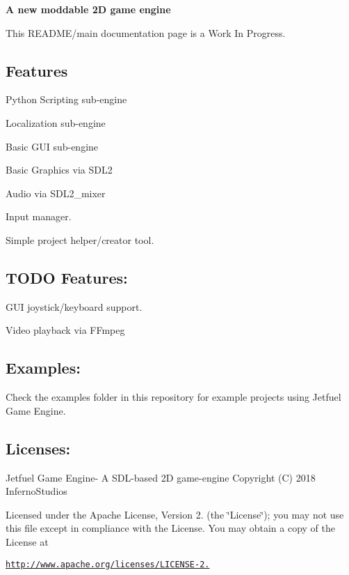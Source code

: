 {\bfseries A new moddable 2D game engine}

This R\+E\+A\+D\+M\+E/main documentation page is a Work In Progress.

\subsection*{Features}


\begin{DoxyItemize}
\item Python Scripting sub-\/engine
\item Localization sub-\/engine
\item Basic G\+UI sub-\/engine
\item Basic Graphics via S\+D\+L2
\item Audio via S\+D\+L2\+\_\+mixer
\item Input manager.
\item Simple project helper/creator tool.
\end{DoxyItemize}

\subsection*{T\+O\+DO Features\+:}


\begin{DoxyItemize}
\item G\+UI joystick/keyboard support.
\item Video playback via F\+Fmpeg
\end{DoxyItemize}

\subsection*{Examples\+:}

Check the examples folder in this repository for example projects using Jetfuel Game Engine.

\subsection*{Licenses\+:}

Jetfuel Game Engine-\/ A S\+D\+L-\/based 2D game-\/engine Copyright (C) 2018 Inferno\+Studios

Licensed under the Apache License, Version 2. (the \char`\"{}\+License\char`\"{}); you may not use this file except in compliance with the License. You may obtain a copy of the License at

\href{http://www.apache.org/licenses/LICENSE-2.0}{\tt http\+://www.\+apache.\+org/licenses/\+L\+I\+C\+E\+N\+S\+E-\/2.}

